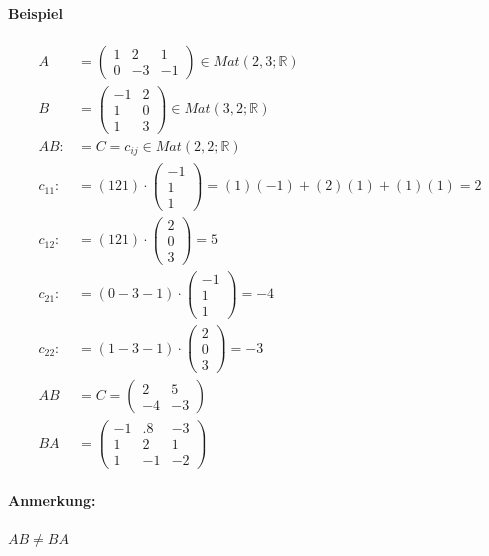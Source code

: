 \documentclass[11pt]{report}
\newcommand*\Zb[1] {\mathbb{#1}}
\begin{document}
\paragraph{Beispiel}
\begin{align}
 A &= \begin{pmatrix} 1 & 2 & 1 \\ 0 & -3 & -1\end{pmatrix}\in Mat(2,3; \Zb{R}) \\ 
 B &= \begin{pmatrix} -1 & 2 \\ 1 & 0 \\ 1 & 3\end{pmatrix}\in Mat(3,2; \Zb{R}) \\
 AB :&= C = c_{ij} \in Mat(2,2; \Zb{R}) \\
 c_{11} :&= (1 2 1)\cdot \begin{pmatrix} -1 \\ 1 \\ 1 \end{pmatrix} = (1)(-1) + (2)(1) + (1)(1) = 2 \\
 c_{12} :&= (1 2 1)\cdot \begin{pmatrix} 2 \\ 0 \\ 3 \end{pmatrix} = 5 \\
 c_{21} :&= (0 -3 -1)\cdot \begin{pmatrix} -1 \\ 1 \\ 1 \end{pmatrix} = -4 \\
 c_{22} :&= (1 -3 -1)\cdot \begin{pmatrix} 2 \\ 0 \\ 3 \end{pmatrix} = -3 \\
 AB &= C = \begin{pmatrix} 2 & 5 \\ -4 & -3 \end{pmatrix} \\
 BA &= \begin{pmatrix} -1 & .8 & -3 \\ 1 & 2 & 1 \\ 1 & -1 & -2 \end{pmatrix}
\end{align}

\paragraph{Anmerkung:}$AB \neq BA$
\end{document}
